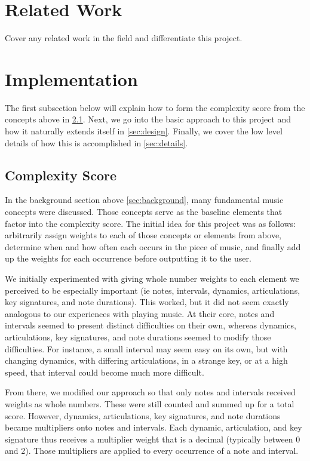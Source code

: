 \documentclass[10pt,preprint]{sigplanconf}
\begin{document}
{\section{Related Work} 
\label{sec:related}

Cover any related work in the field and differentiate this project.

\section{Implementation} 
\label{sec:imple}

The first subsection below will explain how to form the complexity score from the concepts above in \ref{sec:scoring}.  Next, we go into the basic approach to this project and how it naturally extends itself in \ref{sec:design}. Finally, we cover the low level details of how this is accomplished in \ref{sec:details}.

\subsection{Complexity Score} 
\label{sec:scoring}

In the background section above \ref{sec:background}, many fundamental music concepts were discussed. Those concepts serve as the baseline elements that factor into the complexity score. The initial idea for this project was as follows: arbitrarily assign weights to each of those concepts or elements from above, determine when and how often each occurs in the piece of music, and finally add up the weights for each occurrence before outputting it to the user.


We initially experimented with giving whole number weights to each element we perceived to be especially important (ie notes, intervals, dynamics, articulations, key signatures, and note durations). This worked, but it did not seem exactly analogous to our experiences with playing music. At their core, notes and intervals seemed to present distinct difficulties on their own, whereas dynamics, articulations, key signatures, and note durations seemed to modify those difficulties. For instance, a small interval may seem easy on its own, but with changing dynamics, with differing articulations, in a strange key, or at a high speed, that interval could become much more difficult.

From there, we modified our approach so that only notes and intervals received weights as whole numbers. These were still counted and summed up for a total score. However, dynamics, articulations, key signatures, and note durations became multipliers onto notes and intervals. Each dynamic, articulation, and key signature thus receives a multiplier weight that is a decimal (typically between 0 and 2). Those multipliers are applied to every occurrence of a note and interval.

}
\end{document}
